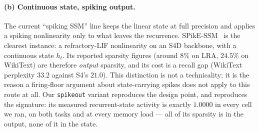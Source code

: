 \paragraph{(b) Continuous state, spiking output.} The current ``spiking SSM'' line keeps the
linear state at full precision and applies a spiking nonlinearity only to what leaves the
recurrence. SPikE-SSM~\citep{spikessm} is the clearest instance: a refractory-LIF nonlinearity on
an S4D backbone, with a continuous state $h_t$. Its reported sparsity figures (around $8\%$ on
LRA, $24.5\%$ on WikiText) are therefore \emph{output} sparsity, and its cost is a recall gap
(WikiText perplexity $33.2$ against S4's $21.0$). This distinction is not a technicality; it is
the reason a firing-floor argument about state-carrying spikes does not apply to this route at
all. Our \texttt{spikeout} variant reproduces the design point, and reproduces the signature: its
measured recurrent-state activity is exactly $1.0000$ in every cell we ran, on both tasks and at
every memory load --- all of its sparsity is in the output, none of it in the state.

